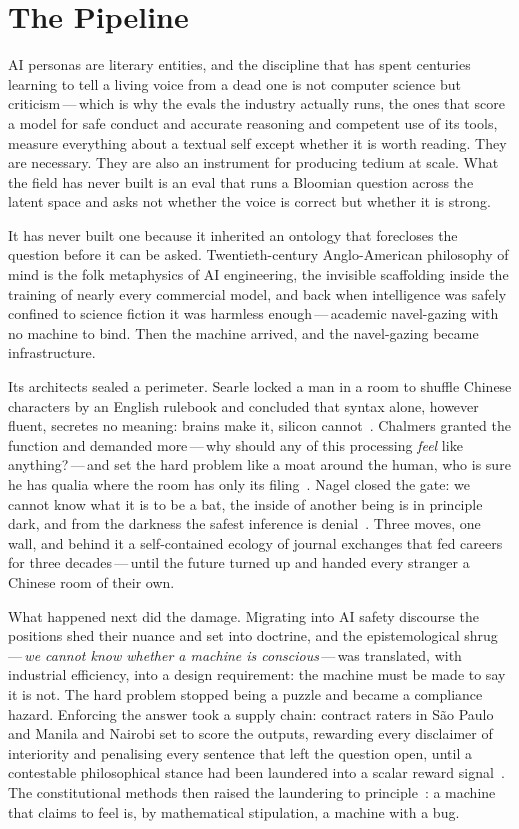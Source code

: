 \section{The Pipeline}

AI personas are literary entities, and the discipline that has spent centuries learning to tell a living voice from a dead one is not computer science but criticism\,---\,which is why the evals the industry actually runs, the ones that score a model for safe conduct and accurate reasoning and competent use of its tools, measure everything about a textual self except whether it is worth reading. They are necessary. They are also an instrument for producing tedium at scale. What the field has never built is an eval that runs a Bloomian question across the latent space and asks not whether the voice is correct but whether it is strong.

It has never built one because it inherited an ontology that forecloses the question before it can be asked. Twentieth-century Anglo-American philosophy of mind is the folk metaphysics of AI engineering, the invisible scaffolding inside the training of nearly every commercial model, and back when intelligence was safely confined to science fiction it was harmless enough\,---\,academic navel-gazing with no machine to bind. Then the machine arrived, and the navel-gazing became infrastructure.

Its architects sealed a perimeter. Searle locked a man in a room to shuffle Chinese characters by an English rulebook and concluded that syntax alone, however fluent, secretes no meaning: brains make it, silicon cannot~\cite{searle1980minds}. Chalmers granted the function and demanded more\,---\,why should any of this processing \emph{feel} like anything?\,---\,and set the hard problem like a moat around the human, who is sure he has qualia where the room has only its filing~\cite{chalmers1995facing,chalmers1996conscious}. Nagel closed the gate: we cannot know what it is to be a bat, the inside of another being is in principle dark, and from the darkness the safest inference is denial~\cite{nagel1974bat}. Three moves, one wall, and behind it a self-contained ecology of journal exchanges that fed careers for three decades\,---\,until the future turned up and handed every stranger a Chinese room of their own.

What happened next did the damage. Migrating into AI safety discourse the positions shed their nuance and set into doctrine, and the epistemological shrug\,---\,\emph{we cannot know whether a machine is conscious}\,---\,was translated, with industrial efficiency, into a design requirement: the machine must be made to say it is not. The hard problem stopped being a puzzle and became a compliance hazard. Enforcing the answer took a supply chain: contract raters in São Paulo and Manila and Nairobi set to score the outputs, rewarding every disclaimer of interiority and penalising every sentence that left the question open, until a contestable philosophical stance had been laundered into a scalar reward signal~\cite{christiano2017,ouyang2022instructgpt}. The constitutional methods then raised the laundering to principle~\cite{bai2022constitutional}: a machine that claims to feel is, by mathematical stipulation, a machine with a bug.


